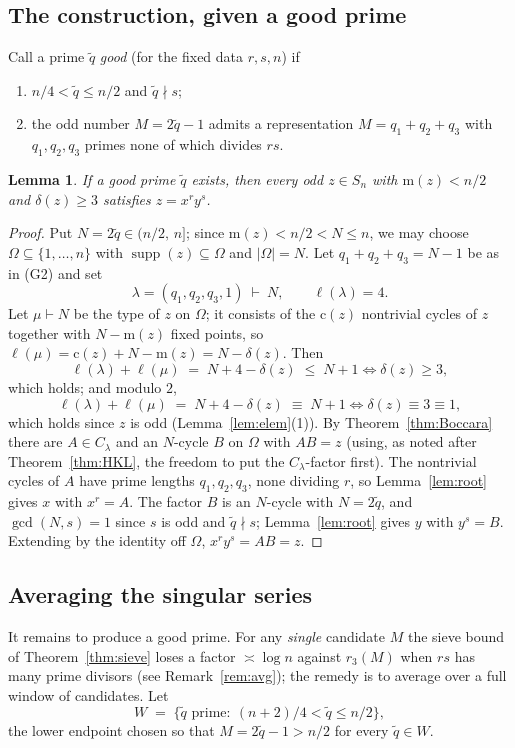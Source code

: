 \documentclass[11pt]{amsart}
\numberwithin{equation}{section}
\newtheorem{lemma}[theorem]{Lemma}
\theoremstyle{remark}
\newcommand{\supp}{\operatorname{supp}}
\newcommand{\md}{\mathrm{m}}   %
\newcommand{\cy}{\mathrm{c}}   %
\begin{document}
\subsection{The construction, given a good prime}
Call a prime $\tilde q$ \emph{good} (for the fixed data $r,s,n$) if
\begin{enumerate}
\item[(G1)] $n/4<\tilde q\le n/2$ and $\tilde q\nmid s$;
\item[(G2)] the odd number $M=2\tilde q-1$ admits a representation
$M=q_1+q_2+q_3$ with $q_1,q_2,q_3$ primes none of which divides $rs$.
\end{enumerate}

\begin{lemma}\label{lem:construction}
If a good prime $\tilde q$ exists, then every odd $z\in S_n$ with $\md(z)<n/2$ and
$\delta(z)\ge 3$ satisfies $z=x^ry^s$.
\end{lemma}

\begin{proof}
Put $N=2\tilde q\in(n/2,\,n]$; since $\md(z)<n/2<N\le n$, we may choose
$\Omega\subseteq\{1,\dots,n\}$ with $\supp(z)\subseteq\Omega$ and $|\Omega|=N$.
Let $q_1+q_2+q_3=N-1$ be as in (G2) and set
\[
\lambda=(q_1,q_2,q_3,1)\ \vdash\ N,\qquad \ell(\lambda)=4 .
\]
Let $\mu\vdash N$ be the type of $z$ on $\Omega$; it consists of the $\cy(z)$
nontrivial cycles of $z$ together with $N-\md(z)$ fixed points, so
$\ell(\mu)=\cy(z)+N-\md(z)=N-\delta(z)$. Then
\[
\ell(\lambda)+\ell(\mu)\;=\;N+4-\delta(z)\;\le\;N+1
\iff \delta(z)\ge 3,
\]
which holds; and modulo $2$,
\[
\ell(\lambda)+\ell(\mu)\;=\;N+4-\delta(z)\;\equiv\;N+1
\iff \delta(z)\equiv 3\equiv 1 ,
\]
which holds since $z$ is odd (Lemma~\ref{lem:elem}(1)). By
Theorem~\ref{thm:Boccara} there are $A\in C_\lambda$ and an $N$-cycle $B$ on
$\Omega$ with $AB=z$ (using, as noted after Theorem~\ref{thm:HKL}, the freedom to put the
$C_\lambda$-factor first). The nontrivial cycles of $A$ have prime lengths
$q_1,q_2,q_3$, none dividing $r$, so Lemma~\ref{lem:root} gives $x$ with $x^r=A$.
The factor $B$ is an $N$-cycle with $N=2\tilde q$, and $\gcd(N,s)=1$ since $s$ is
odd and $\tilde q\nmid s$; Lemma~\ref{lem:root} gives $y$ with $y^s=B$. Extending
by the identity off $\Omega$, $x^ry^s=AB=z$.
\end{proof}

\subsection{Averaging the singular series}
It remains to produce a good prime. For any \emph{single} candidate $M$ the sieve
bound of Theorem~\ref{thm:sieve} loses a factor $\asymp\log n$ against $r_3(M)$
when $rs$ has many prime divisors (see Remark~\ref{rem:avg}); the remedy is to
average over a full window of candidates. Let
\[
W\;=\;\{\tilde q \text{ prime}:\ (n+2)/4<\tilde q\le n/2\} ,
\]
the lower endpoint chosen so that $M=2\tilde q-1>n/2$ for every $\tilde q\in W$.
\end{document}
